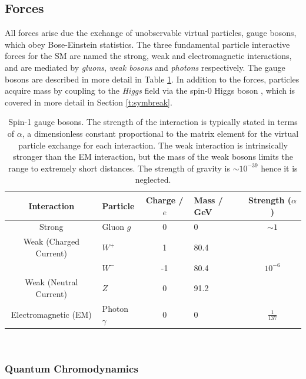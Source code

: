	\subsection{Forces}

		All forces arise due the exchange of unobservable virtual particles, gauge bosons, which obey Bose-Einstein statistics. The three fundamental particle interactive forces for the SM are named the strong, weak and electromagnetic interactions, and are mediated by \textit{gluons}, \textit{weak bosons} and \textit{photons} respectively. The gauge bosons are described in more detail in Table \ref{t:tab:boson}. In addition to the forces, particles acquire mass by coupling to the \textit{Higgs} field via the spin-$0$ Higgs boson \cite{gauge-boson-mass, higgs-1, higgs-2}, which is covered in more detail in Section \ref{t:symbreak}.

		\begin{table}[ht]
			\caption{Spin-1 gauge bosons. The strength of the interaction is typically stated in terms of $\alpha$, a dimensionless constant proportional to the matrix element for the virtual particle exchange for each interaction. The weak interaction is intrinsically stronger than the EM interaction, but the mass of the weak bosons limits the range to extremely short distances.  The strength of gravity is $\sim10^{-39}$ hence it is neglected. \cite{pdg}}
			\label{t:tab:boson}
			\medskip
			\centering
			\begin{tabular}{clclc}\toprule
				Interaction & Particle & Charge / $e$ & Mass / GeV & Strength ($\alpha$) \\\midrule
				Strong    &     Gluon $g$      &    0   & 0& $\sim1$\\
				Weak (Charged Current)&     $W^+$    &    1   & 80.4 & \\
				&     $W^-$    &    -1   & 80.4 & $10^{-6}$ \\
				Weak (Neutral Current)&     $Z$   &    0   & 91.2 & \\
				Electromagnetic (EM)   &     Photon $\gamma$  &   0   & 0 & $\frac{1}{137}$\\\bottomrule
			\end{tabular}\\[5pt]
		\end{table}

		\newpage
		\subsubsection{Quantum Chromodynamics}

